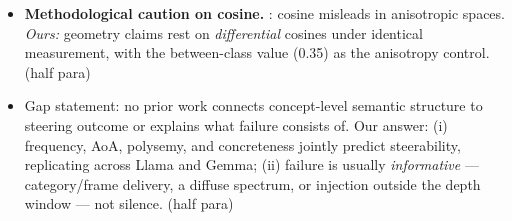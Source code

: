 \documentclass[11pt]{article}
\newenvironment{outline}{\color{gray!70!black}\begin{itemize}[leftmargin=1.2em,itemsep=1pt]}{\end{itemize}\color{black}}
\begin{document}
\begin{outline}
\item \textbf{Methodological caution on cosine.} \citet{you2025semantics}: cosine misleads in anisotropic spaces. \emph{Ours:} geometry claims rest on \emph{differential} cosines under identical measurement, with the between-class value (0.35) as the anisotropy control. (half para)
\item Gap statement: no prior work connects concept-level semantic structure to steering outcome or explains what failure consists of. Our answer: (i) frequency, AoA, polysemy, and concreteness jointly predict steerability, replicating across Llama and Gemma; (ii) failure is usually \emph{informative} --- category/frame delivery, a diffuse spectrum, or injection outside the depth window --- not silence. (half para)
\end{outline}
\end{document}

